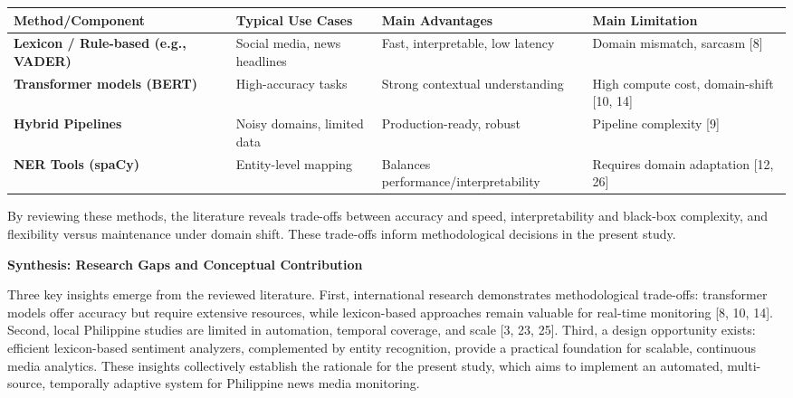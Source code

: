 {\def\LTcaptype{none} %
\begin{longtable}[]{@{}
  >{\raggedright\arraybackslash}p{}
  >{\raggedright\arraybackslash}p{}
  >{\raggedright\arraybackslash}p{}
  >{\raggedright\arraybackslash}p{}@{}}
\toprule\noalign{}
\begin{minipage}[b]{\linewidth}\raggedright
\textbf{Method/Component}
\end{minipage} & \begin{minipage}[b]{\linewidth}\raggedright
\textbf{Typical Use Cases}
\end{minipage} & \begin{minipage}[b]{\linewidth}\raggedright
\textbf{Main Advantages}
\end{minipage} & \begin{minipage}[b]{\linewidth}\raggedright
\textbf{Main Limitation}
\end{minipage} \\
\midrule\noalign{}
\endhead
\bottomrule\noalign{}
\endlastfoot
\textbf{Lexicon / Rule-based (e.g., VADER)} & Social media, news headlines & Fast, interpretable, low latency & Domain mismatch, sarcasm {[}8{]} \\
\textbf{Transformer models (BERT)} & High-accuracy tasks & Strong contextual understanding & High compute cost, domain-shift {[}10, 14{]} \\
\textbf{Hybrid Pipelines} & Noisy domains, limited data & Production-ready, robust & Pipeline complexity {[}9{]} \\
\textbf{NER Tools (spaCy)} & Entity-level mapping & Balances performance/interpretability & Requires domain adaptation {[}12, 26{]} \\
\end{longtable}
}

By reviewing these methods, the literature reveals trade-offs between accuracy and speed, interpretability and black-box complexity, and flexibility versus maintenance under domain shift. These trade-offs inform methodological decisions in the present study.

\textbf{Synthesis: Research Gaps and Conceptual Contribution}

Three key insights emerge from the reviewed literature. First, international research demonstrates methodological trade-offs: transformer models offer accuracy but require extensive resources, while lexicon-based approaches remain valuable for real-time monitoring {[}8, 10, 14{]}. Second, local Philippine studies are limited in automation, temporal coverage, and scale {[}3, 23, 25{]}. Third, a design opportunity exists: efficient lexicon-based sentiment analyzers, complemented by entity recognition, provide a practical foundation for scalable, continuous media analytics. These insights collectively establish the rationale for the present study, which aims to implement an automated, multi-source, temporally adaptive system for Philippine news media monitoring.

